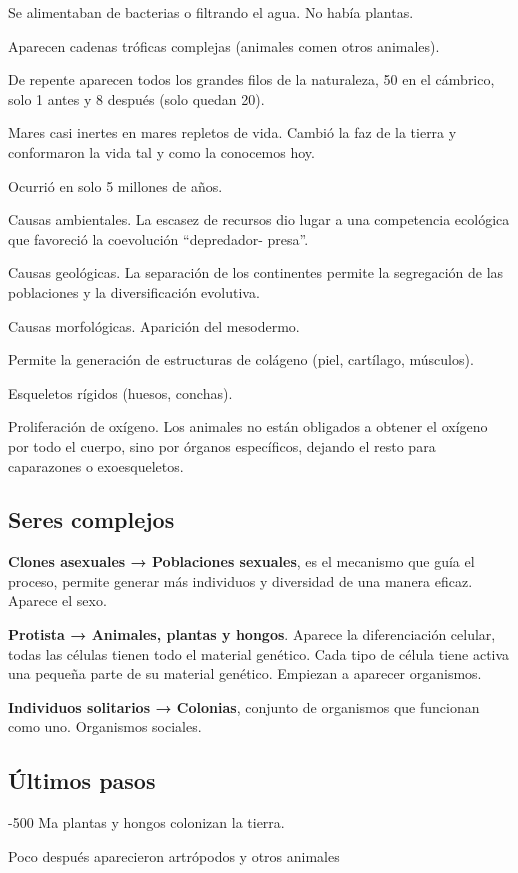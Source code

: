 \documentclass[12pt, twoside, openright]{report} %
\begin{document}
Se alimentaban de bacterias o filtrando el agua. No había plantas.

Aparecen cadenas tróficas complejas (animales comen otros animales).

De repente aparecen todos los grandes filos de la naturaleza, 50 en el cámbrico, solo 1 antes y 8 después (solo quedan 20).

Mares casi inertes en mares repletos de vida. Cambió la faz de la tierra y conformaron la vida tal y como la conocemos hoy.

Ocurrió en solo 5 millones de años.

Causas ambientales. La escasez de recursos dio lugar a una competencia ecológica que favoreció la coevolución “depredador- presa”.

Causas geológicas. La separación de los continentes permite la segregación de las poblaciones y la diversificación evolutiva.

Causas morfológicas. Aparición del mesodermo.

Permite la generación de estructuras de colágeno (piel, cartílago, músculos).

Esqueletos rígidos (huesos, conchas).

Proliferación de oxígeno. Los animales no están obligados a obtener el oxígeno por todo el cuerpo, sino por órganos específicos, dejando el resto para caparazones o exoesqueletos.

\subsection{Seres complejos}
\textbf{Clones asexuales → Poblaciones sexuales}, es el mecanismo que guía el proceso, permite generar más individuos y diversidad de una manera eficaz. Aparece el sexo.

\textbf{Protista → Animales, plantas y hongos}. Aparece la diferenciación celular, todas las células tienen todo el material genético. Cada tipo de célula tiene activa una pequeña parte de su material genético. Empiezan a aparecer organismos.

\textbf{Individuos solitarios → Colonias}, conjunto de organismos que funcionan como uno. Organismos sociales.

\subsection{Últimos pasos}
-500 Ma plantas y hongos colonizan la tierra.

Poco después aparecieron artrópodos y otros animales
\end{document}
